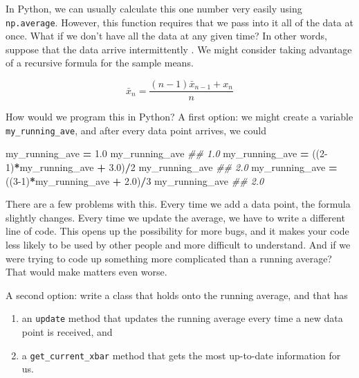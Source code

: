 \documentclass[12pt,krantz2]{krantz}
\makeatletter
\newenvironment{Shaded}{\begin{snugshade}}{\end{snugshade}}
\newcommand{\CommentTok}[1]{\textcolor[rgb]{0.37,0.37,0.37}{\textit{#1}}}
\newcommand{\DecValTok}[1]{\textcolor[rgb]{0.06,0.06,0.06}{#1}}
\newcommand{\FloatTok}[1]{\textcolor[rgb]{0.06,0.06,0.06}{#1}}
\newcommand{\NormalTok}[1]{#1}
\newcommand{\OperatorTok}[1]{\textcolor[rgb]{0.43,0.43,0.43}{\textbf{#1}}}
\providecommand{\tightlist}{%
  \setlength{\itemsep}{0pt}\setlength{\parskip}{0pt}}
\newenvironment{kframe}{%
\medskip{}
\setlength{\fboxsep}{.8em}
 \def\at@end@of@kframe{}%
 \ifinner\ifhmode%
  \def\at@end@of@kframe{\end{minipage}}%
  \begin{minipage}{\columnwidth}%
 \fi\fi%
 \def\FrameCommand##1{\hskip\@totalleftmargin \hskip-\fboxsep
 \colorbox{shadecolor}{##1}\hskip-\fboxsep
     \hskip-\linewidth \hskip-\@totalleftmargin \hskip\columnwidth}%
 \MakeFramed {\advance\hsize-\width
   \@totalleftmargin\z@ \linewidth\hsize
   \@setminipage}}%
 {\par\unskip\endMakeFramed%
 \at@end@of@kframe}
\renewenvironment{Shaded}{\begin{kframe}}{\end{kframe}}
\makeatother
\begin{document}
In Python, we can usually calculate this one number very easily using \texttt{np.average}. However, this function requires that we pass into it all of the data at once. What if we don't have all the data at any given time? In other words, suppose that the data arrive intermittently
.
We might consider taking advantage of a recursive formula for the sample means.

\begin{equation} 
\bar{x}_n =  \frac{(n-1) \bar{x}_{n-1} + x_n}{n}
\end{equation}

How would we program this in Python? A first option: we might create a variable \texttt{my\_running\_ave}, and after every data point arrives, we could

\begin{Shaded}
\begin{Highlighting}[]
\NormalTok{my_running_ave }\OperatorTok{=} \FloatTok{1.0}
\NormalTok{my_running_ave}
\CommentTok{## 1.0}
\NormalTok{my_running_ave }\OperatorTok{=}\NormalTok{ ((}\DecValTok{2-1}\NormalTok{)}\OperatorTok{*}\NormalTok{my_running_ave }\OperatorTok{+} \FloatTok{3.0}\NormalTok{)}\OperatorTok{/}\DecValTok{2}
\NormalTok{my_running_ave}
\CommentTok{## 2.0}
\NormalTok{my_running_ave }\OperatorTok{=}\NormalTok{ ((}\DecValTok{3-1}\NormalTok{)}\OperatorTok{*}\NormalTok{my_running_ave }\OperatorTok{+} \FloatTok{2.0}\NormalTok{)}\OperatorTok{/}\DecValTok{3}
\NormalTok{my_running_ave}
\CommentTok{## 2.0}
\end{Highlighting}
\end{Shaded}

There are a few problems with this. Every time we add a data point, the formula slightly changes. Every time we update the average, we have to write a different line of code. This opens up the possibility for more bugs, and it makes your code less likely to be used by other people and more difficult to understand. And if we were trying to code up something more complicated than a running average? That would make matters even worse.

A second option: write a class that holds onto the running average, and that has

\begin{enumerate}
\def\labelenumi{\arabic{enumi}.}
\tightlist
\item
  an \texttt{update} method that updates the running average every time a new data point is received, and
\item
  a \texttt{get\_current\_xbar} method that gets the most up-to-date information for us.
\end{enumerate}
\end{document}
